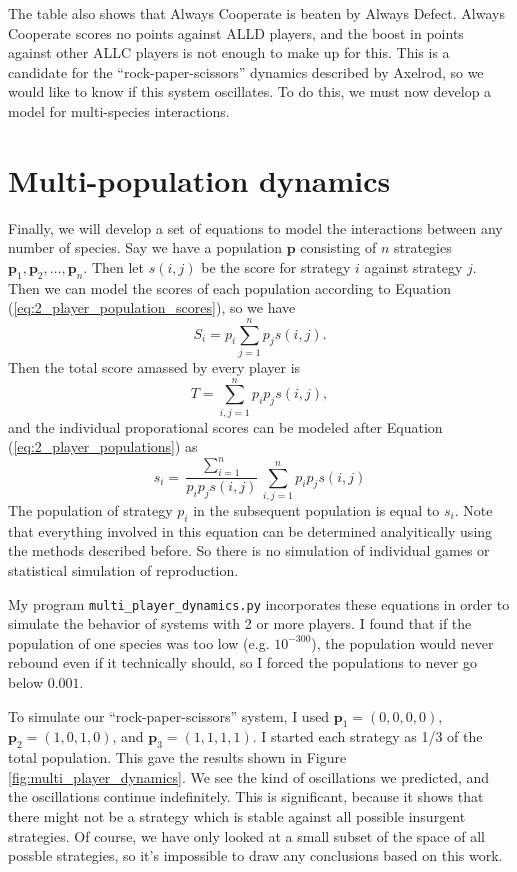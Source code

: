 \documentclass{article}
\renewcommand{\vec}[1]{\mathbf{#1}}
\begin{document}
The table also shows that Always Cooperate is beaten by Always Defect. Always Cooperate scores no points against ALLD players, and the boost in points against other ALLC players is not enough to make up for this. This is a candidate for the ``rock-paper-scissors'' dynamics described by Axelrod, so we would like to know if this system oscillates. To do this, we must now develop a model for multi-species interactions.

\section{Multi-population dynamics}
Finally, we will develop a set of equations to model the interactions between any number of species. Say we have a population \(\vec{p}\) consisting of \(n\) strategies \(\vec{p}_1, \vec{p}_2, \ldots, \vec{p}_n\). Then let \(s(i, j)\) be the score for strategy \(i\) against strategy \(j\). Then we can model the scores of each population according to Equation (\ref{eq:2_player_population_scores}), so we have
\[S_i = p_i \sum_{j = 1}^n p_j s(i, j).\]
Then the total score amassed by every player is
\[T = \sum_{i,j = 1}^n p_i p_j s(i, j),\]
and the individual proporational scores can be modeled after Equation (\ref{eq:2_player_populations}) as
\[s_i = \frac{\sum_{i = 1}^n}{p_i p_j s(i, j)}{\sum_{i,j = 1}^n p_i p_j s(i, j)}\]
The population of strategy \(p_i\) in the subsequent population is equal to \(s_i\). Note that everything involved in this equation can be determined analyitically using the methods described before. So there is no simulation of individual games or statistical simulation of reproduction.

My program \texttt{multi\_player\_dynamics.py} incorporates these equations in order to simulate the behavior of systems with 2 or more players. I found that if the population of one species was too low (e.g. \(10^{-300}\)), the population would never rebound even if it technically should, so I forced the populations to never go below \(0.001\).

To simulate our ``rock-paper-scissors'' system, I used \(\vec{p}_1 = (0, 0, 0, 0)\), \(\vec{p}_2 = (1, 0, 1, 0)\), and \(\vec{p}_3 = (1, 1, 1, 1)\). I started each strategy as 1/3 of the total population. This gave the results shown in Figure \ref{fig:multi_player_dynamics}. We see the kind of oscillations we predicted, and the oscillations continue indefinitely. This is significant, because it shows that there might not be a strategy which is stable against all possible insurgent strategies. Of course, we have only looked at a small subset of the space of all possble strategies, so it's impossible to draw any conclusions based on this work.
\end{document}
